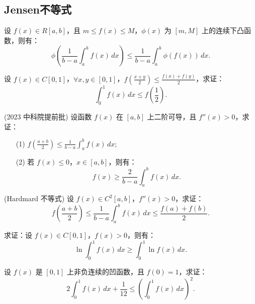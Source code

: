 \documentclass[lang=cn,10pt,thmcnt=section]{elegantbook}
\begin{document}
\subsection{Jensen不等式}
\begin{example}[Jensen不等式]
	设 \( f(x) \in R[a, b] \)，且 \( m \leq f(x) \leq M \)，\(\phi(x)\) 为 \([m, M]\) 上的连续下凸函数，则有：
\[
\phi\left( \frac{1}{b - a} \int_a^b f(x) \, dx \right) \leq \frac{1}{b - a} \int_a^b \phi(f(x)) \, dx.
\]
\end{example}
\begin{example}
	设 \( f(x) \in C[0,1] \)，\(\forall x, y \in [0,1]\)，\( f\left( \frac{x + y}{2} \right) \leq \frac{f(x) + f(y)}{2} \)，求证：
\[
\int_0^1 f(x) \, dx \leq f\left( \frac{1}{2} \right).
\]
\end{example}
\begin{example}
	(2023 中科院提前批) 设函数 \( f(x) \) 在 \([a, b]\) 上二阶可导，且 \( f''(x) > 0 \)，求证：
\begin{itemize}
    \item[(1)] \( f\left( \frac{a + b}{2} \right) \leq \frac{1}{b - a} \int_a^b f(x) \, dx \);
    \item[(2)] 若 \( f(x) \leq 0 \)，\( x \in [a, b] \)，则有：
    \[
    f(x) \geq \frac{2}{b - a} \int_a^b f(x) \, dx.
    \]
\end{itemize}
\end{example}
\begin{example}
	(Hardmard 不等式) 设 \( f(x) \in C^2[a, b] \)，\( f''(x) > 0 \)，求证：
\[
f\left( \frac{a + b}{2} \right) \leq \frac{1}{b - a} \int_a^b f(x) \, dx \leq \frac{f(a) + f(b)}{2}.
\]
\end{example}
\begin{example}
	求证：设 \( f(x) \in C[0,1] \)，\( f(x) > 0 \)，则有：
    \[
    \ln \int_0^1 f(x) \, dx \geq \int_0^1 \ln f(x) \, dx.
    \]
\end{example}
\begin{example}
	设 \( f(x) \) 是 \([0,1]\) 上非负连续的凹函数，且 \( f(0) = 1 \)，求证：
    \[
    2 \int_0^1 f(x) \, dx + \frac{1}{12} \leq \left( \int_0^1 f(x) \, dx \right)^2.
    \]
\end{example}
\end{document}
